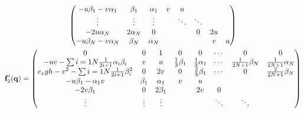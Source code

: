 \documentclass[oneside]{article}
\begin{document}
\begin{gather*}
\begin{pmatrix}
    -u \beta_1 - v \alpha_1                                            & \beta_1    & \alpha_1 & v                     & u                      &        &                           &                         \\
    \vdots                                                             & \vdots     & \vdots   &                       & \ddots                 & \ddots &                           &                         \\
    -2 u \alpha_N                                                      & 2 \alpha_N & 0        &                       &                        & 0      & 2u                        &                         \\
    -u \beta_N - v \alpha_N                                            & \beta_N    & \alpha_N &                       &                        &        & v                         & u                       \\
  \end{pmatrix} \\
  \mathbf{f}_2'(\mathbf{q}) =
  \begin{pmatrix}
    0                                                              & 0       & 1         & 0                     & 0                      & \cdots & 0                      & 0                        \\
    -uv - \sum{i = 1}{N}{\frac{1}{2i + 1} \alpha_i \beta_i}        & v       & u         & \frac{1}{3} \beta_{1} & \frac{1}{3} \alpha_{1} & \cdots & \frac{1}{2N+1} \beta_N & \frac{1}{2N+1} \alpha_N  \\
    e_{z} g h - v^{2} - \sum{i = 1}{N}{\frac{1}{2i + 1} \beta_i^2} & 0       & 2v        & 0                     & \frac{2}{3} \beta_1    & \cdots & 0                      & \frac{2}{2N + 1} \beta_N \\
    - u\beta_1 - \alpha_1 v                                        & \beta_1 & \alpha_1  & v                     & u                      &        &                        &                          \\
    -2 v \beta_1                                                   & 0       & 2 \beta_1 &                       & 2 v                    & 0      &                        &                          \\
    \vdots                                                         & \vdots  & \vdots    &                       &                        & \ddots & \ddots                 &                          \\

\end{pmatrix}
\end{gather*}
\end{document}
